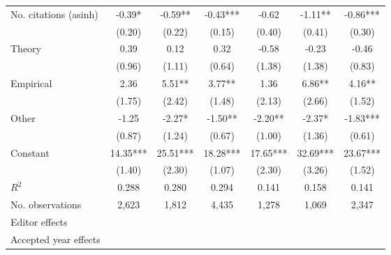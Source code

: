 \begin{table}
\begin{threeparttable}
\begin{tabular}{p{3.78cm}S@{}S@{}S@{}S@{}S@{}S@{}}
            No. citations (asinh)         &       -0.39*  &       -0.59** &       -0.43***&       -0.62   &       -1.11** &       -0.86***\\
                                          &      (0.20)   &      (0.22)   &      (0.15)   &      (0.40)   &      (0.41)   &      (0.30)   \\
            Theory                        &        0.39   &        0.12   &        0.32   &       -0.58   &       -0.23   &       -0.46   \\
                                          &      (0.96)   &      (1.11)   &      (0.64)   &      (1.38)   &      (1.38)   &      (0.83)   \\
            Empirical                     &        2.36   &        5.51** &        3.77** &        1.36   &        6.86** &        4.16** \\
                                          &      (1.75)   &      (2.42)   &      (1.48)   &      (2.13)   &      (2.66)   &      (1.52)   \\
            Other                         &       -1.25   &       -2.27*  &       -1.50** &       -2.20** &       -2.37*  &       -1.83***\\
                                          &      (0.87)   &      (1.24)   &      (0.67)   &      (1.00)   &      (1.36)   &      (0.61)   \\
            Constant                      &       14.35***&       25.51***&       18.28***&       17.65***&       32.69***&       23.67***\\
                                          &      (1.40)   &      (2.30)   &      (1.07)   &      (2.30)   &      (3.26)   &      (1.52)   \\
            \midrule
            \(R^2\)                       &       0.288   &       0.280   &       0.294   &       0.141   &       0.158   &       0.141   \\
            No. observations              &       2,623   &       1,812   &       4,435   &       1,278   &       1,069   &       2,347   \\
            \midrule
            Editor effects       &           {}   &           {}   &           {}   &           {}   &           {}   &           {}   \\
            Accepted year effects         &           {}   &           {}   &               &           {}   &           {}   &               \\

\end{tabular}
\end{threeparttable}
\end{table}
